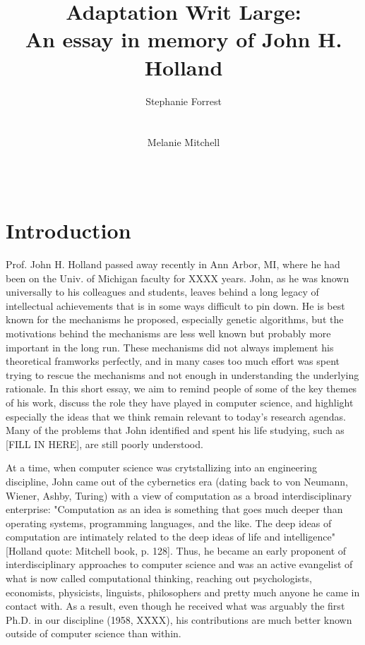 \documentclass{sig-alternate}
\title{Adaptation Writ Large:\\ An essay in memory of John H. Holland}
\author 
{\alignauthor
 Stephanie Forrest\\
 \affaddr{University of New Mexico}\\
 \affaddr{Santa Fe Institute}\\
 \email{forrest@cs.unm.edu}
 \alignauthor
Melanie Mitchell \\
 \affaddr{Portland State University}\\
 \affaddr{Santa Fe Institute}\\
 \email{mm@cs.pdx.edu}
}
\begin{document}
\maketitle

% 

\section{Introduction}

Prof. John H. Holland passed away recently in Ann Arbor, MI, where he had been on the Univ. of Michigan faculty for XXXX years.  John, as he was known universally to his colleagues and students, 
leaves behind a long legacy of intellectual achievements that is in some ways difficult to pin down.   He is best known for the mechanisms he proposed, especially genetic algorithms, but the motivations behind the mechanisms are less well known but probably more important in the long run.  These mechanisms did not always implement his theoretical framworks perfectly, and in many cases too much effort was spent trying to rescue the mechanisms and not enough in understanding the underlying rationale.  In this short essay, we aim to remind people of some of the key themes of his work, discuss the role they have played in computer science, and highlight especially the ideas that we think remain relevant to today's research agendas.  Many of the problems that John identified and spent his life studying, such as [FILL IN HERE], are still poorly understood.

At a time, when computer science was crytstallizing into an engineering discipline, John came out of the cybernetics era (dating back to von Neumann, Wiener, Ashby, Turing) with a view of computation as a broad interdisciplinary enterprise: "Computation as an idea is something that goes much deeper than operating systems, programming languages, and the like.  The deep ideas of computation are intimately related to the deep ideas of life and intelligence" [Holland quote: Mitchell book, p. 128].  Thus, he became an early proponent of interdisciplinary approaches to computer science and was an active evangelist of what is now called computational thinking, reaching out psychologists, economists, physicists, linguists, philosophers and pretty much anyone he came in contact with.  As a result, even though he received what was arguably the first Ph.D. in our discipline (1958, XXXX), his contributions are much better known outside of computer science than within.
\end{document}
